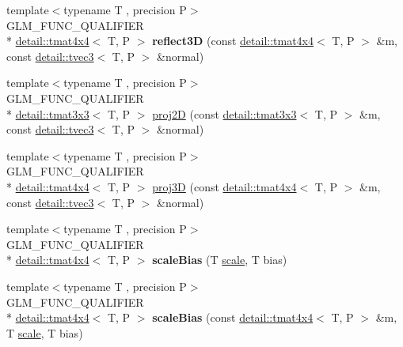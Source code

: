 \begin{DoxyCompactItemize}
\item 
\hypertarget{namespaceglm_a1c0b4d42e9d4230035d2ffb1d4296a4a}{{\footnotesize template$<$typename T , precision P$>$ }\\G\-L\-M\-\_\-\-F\-U\-N\-C\-\_\-\-Q\-U\-A\-L\-I\-F\-I\-E\-R \\*
\hyperlink{structglm_1_1detail_1_1tmat4x4}{detail\-::tmat4x4}$<$ T, P $>$ {\bfseries reflect3\-D} (const \hyperlink{structglm_1_1detail_1_1tmat4x4}{detail\-::tmat4x4}$<$ T, P $>$ \&m, const \hyperlink{structglm_1_1detail_1_1tvec3}{detail\-::tvec3}$<$ T, P $>$ \&normal)}\label{namespaceglm_a1c0b4d42e9d4230035d2ffb1d4296a4a}

\item 
{\footnotesize template$<$typename T , precision P$>$ }\\G\-L\-M\-\_\-\-F\-U\-N\-C\-\_\-\-Q\-U\-A\-L\-I\-F\-I\-E\-R \\*
\hyperlink{structglm_1_1detail_1_1tmat3x3}{detail\-::tmat3x3}$<$ T, P $>$ \hyperlink{group__gtx__transform2_gad51e1fa33875b966db2f97cb7f21c48a}{proj2\-D} (const \hyperlink{structglm_1_1detail_1_1tmat3x3}{detail\-::tmat3x3}$<$ T, P $>$ \&m, const \hyperlink{structglm_1_1detail_1_1tvec3}{detail\-::tvec3}$<$ T, P $>$ \&normal)
\item 
{\footnotesize template$<$typename T , precision P$>$ }\\G\-L\-M\-\_\-\-F\-U\-N\-C\-\_\-\-Q\-U\-A\-L\-I\-F\-I\-E\-R \\*
\hyperlink{structglm_1_1detail_1_1tmat4x4}{detail\-::tmat4x4}$<$ T, P $>$ \hyperlink{group__gtx__transform2_ga70a21b940727b94060fd3826eeacb048}{proj3\-D} (const \hyperlink{structglm_1_1detail_1_1tmat4x4}{detail\-::tmat4x4}$<$ T, P $>$ \&m, const \hyperlink{structglm_1_1detail_1_1tvec3}{detail\-::tvec3}$<$ T, P $>$ \&normal)
\item 
\hypertarget{namespaceglm_a5a113176ab39952ded7ecc6cf745d4d3}{{\footnotesize template$<$typename T , precision P$>$ }\\G\-L\-M\-\_\-\-F\-U\-N\-C\-\_\-\-Q\-U\-A\-L\-I\-F\-I\-E\-R \\*
\hyperlink{structglm_1_1detail_1_1tmat4x4}{detail\-::tmat4x4}$<$ T, P $>$ {\bfseries scale\-Bias} (T \hyperlink{group__gtc__matrix__transform_gabd40959f269abd16c256a4f59ab03d62}{scale}, T bias)}\label{namespaceglm_a5a113176ab39952ded7ecc6cf745d4d3}

\item 
\hypertarget{namespaceglm_a8ab0c3b1c92fcaf845bcb6ee9ea1c70e}{{\footnotesize template$<$typename T , precision P$>$ }\\G\-L\-M\-\_\-\-F\-U\-N\-C\-\_\-\-Q\-U\-A\-L\-I\-F\-I\-E\-R \\*
\hyperlink{structglm_1_1detail_1_1tmat4x4}{detail\-::tmat4x4}$<$ T, P $>$ {\bfseries scale\-Bias} (const \hyperlink{structglm_1_1detail_1_1tmat4x4}{detail\-::tmat4x4}$<$ T, P $>$ \&m, T \hyperlink{group__gtc__matrix__transform_gabd40959f269abd16c256a4f59ab03d62}{scale}, T bias)}\label{namespaceglm_a8ab0c3b1c92fcaf845bcb6ee9ea1c70e}


\end{DoxyCompactItemize}
